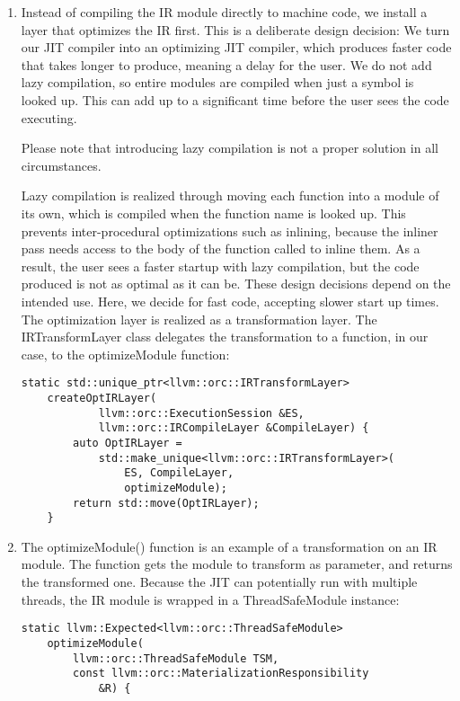 \begin{enumerate}
\item Instead of compiling the IR module directly to machine code, we install a layer that optimizes the IR first. This is a deliberate design decision: We turn our JIT compiler into an optimizing JIT compiler, which produces faster code that takes longer to produce, meaning a delay for the user. We do not add lazy compilation, so entire modules are compiled when just a symbol is looked up. This can add up to a significant time before the user sees the code executing.

\begin{tcolorbox}[colback=blue!5!white,colframe=blue!75!black, title=Note]
Please note that introducing lazy compilation is not a proper solution in all circumstances.	
\end{tcolorbox}

Lazy compilation is realized through moving each function into a module of its own, which is compiled when the function name is looked up. This prevents inter-procedural optimizations such as inlining, because the inliner pass needs access to the body of the function called to inline them. As a result, the user sees a faster startup with lazy compilation, but the code produced is not as optimal as it can be. These design decisions depend on the intended use. Here, we decide for fast code, accepting slower start up times. The optimization layer is realized as a transformation layer. The IRTransformLayer class delegates the transformation to a function, in our case, to the optimizeModule function:
\begin{lstlisting}[caption={}]
	static std::unique_ptr<llvm::orc::IRTransformLayer>
	createOptIRLayer(
			llvm::orc::ExecutionSession &ES,
			llvm::orc::IRCompileLayer &CompileLayer) {
		auto OptIRLayer =
			std::make_unique<llvm::orc::IRTransformLayer>(
				ES, CompileLayer,
				optimizeModule);
		return std::move(OptIRLayer);
	}
\end{lstlisting}

\item The optimizeModule() function is an example of a transformation on an IR module. The function gets the module to transform as parameter, and returns the transformed one. Because the JIT can potentially run with multiple threads, the IR module is wrapped in a ThreadSafeModule instance:
\begin{lstlisting}[caption={}]
	static llvm::Expected<llvm::orc::ThreadSafeModule>
	optimizeModule(
		llvm::orc::ThreadSafeModule TSM,
		const llvm::orc::MaterializationResponsibility
			&R) {
\end{lstlisting}


\end{enumerate}
